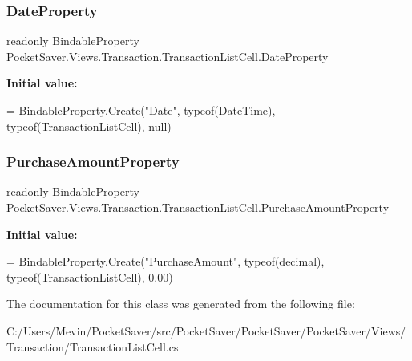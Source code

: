 \subsubsection{\texorpdfstring{Date\+Property}{DateProperty}}
{\footnotesize\ttfamily readonly Bindable\+Property Pocket\+Saver.\+Views.\+Transaction.\+Transaction\+List\+Cell.\+Date\+Property\hspace{0.3cm}{\ttfamily [static]}}

{\bfseries Initial value\+:}
\begin{DoxyCode}
=
            BindableProperty.Create(\textcolor{stringliteral}{"Date"}, typeof(DateTime), typeof(TransactionListCell), null)
\end{DoxyCode}
\mbox{\label{class_pocket_saver_1_1_views_1_1_transaction_1_1_transaction_list_cell_aabf6dc4177c779f522a46f61f843ed49}} 
\subsubsection{\texorpdfstring{Purchase\+Amount\+Property}{PurchaseAmountProperty}}
{\footnotesize\ttfamily readonly Bindable\+Property Pocket\+Saver.\+Views.\+Transaction.\+Transaction\+List\+Cell.\+Purchase\+Amount\+Property\hspace{0.3cm}{\ttfamily [static]}}

{\bfseries Initial value\+:}
\begin{DoxyCode}
=
            BindableProperty.Create(\textcolor{stringliteral}{"PurchaseAmount"}, typeof(decimal), typeof(TransactionListCell), 0.00)
\end{DoxyCode}


The documentation for this class was generated from the following file\+:\begin{DoxyCompactItemize}
\item 
C\+:/\+Users/\+Mevin/\+Pocket\+Saver/src/\+Pocket\+Saver/\+Pocket\+Saver/\+Pocket\+Saver/\+Views/\+Transaction/Transaction\+List\+Cell.\+cs\end{DoxyCompactItemize}
